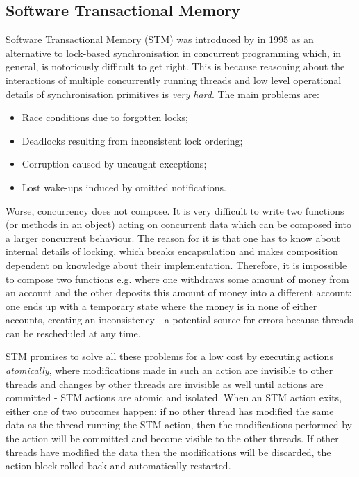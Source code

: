 \subsection{Software Transactional Memory}
Software Transactional Memory (STM) was introduced by \cite{shavit_software_1995} in 1995 as an alternative to lock-based synchronisation in concurrent programming which, in general, is notoriously difficult to get right. This is because reasoning about the interactions of multiple concurrently running threads and low level operational details of synchronisation primitives is \textit{very hard}. The main problems are:

\begin{itemize}
	\item Race conditions due to forgotten locks;
	\item Deadlocks resulting from inconsistent lock ordering;
	\item Corruption caused by uncaught exceptions;
	\item Lost wake-ups induced by omitted notifications.
\end{itemize}

Worse, concurrency does not compose. It is very difficult to write two functions (or methods in an object) acting on concurrent data which can be composed into a larger concurrent behaviour. The reason for it is that one has to know about internal details of locking, which breaks encapsulation and makes composition dependent on knowledge about their implementation. Therefore, it is impossible to compose two  functions e.g. where one withdraws some amount of money from an account and the other deposits this amount of money into a different account: one ends up with a temporary state where the money is in none of either accounts, creating an inconsistency - a potential source for errors because threads can be rescheduled at any time.

STM promises to solve all these problems for a low cost by executing actions \textit{atomically}, where modifications made in such an action are invisible to other threads and changes by other threads are invisible as well until actions are committed - STM actions are atomic and isolated. When an STM action exits, either one of two outcomes happen: if no other thread has modified the same data as the thread running the STM action, then the modifications performed by the action will be committed and become visible to the other threads. If other threads have modified the data then the modifications will be discarded, the action block rolled-back and automatically restarted.

